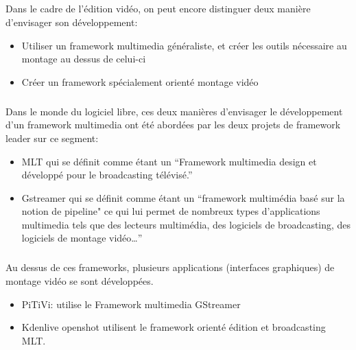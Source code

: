 \subparagraph{}

Dans le cadre de l'édition vidéo, on peut encore distinguer deux
manière d'envisager son développement:

\begin {itemize}

  \item {Utiliser un framework multimedia généraliste, et créer les
  outils nécessaire
         au montage au dessus de celui-ci} %

  \item {Créer un framework spécialement orienté montage vidéo}

\end {itemize}

\subparagraph{}

Dans le monde du logiciel libre, ces deux manières d'envisager le
développement d'un framework multimedia ont été abordées par les
deux projets de framework leader sur ce segment:

\begin {itemize}

  \item {MLT qui se définit comme étant un ``Framework multimedia design
    et développé pour le broadcasting télévisé.''}

  \item {Gstreamer qui se définit comme étant un ``framework multimédia
    basé sur la notion de pipeline" ce qui lui permet de nombreux types
    d'applications multimedia tels que des lecteurs multimédia, des
    logiciels de broadcasting, des logiciels de montage vidéo\ldots''}

\end {itemize}

\subparagraph {}

Au dessus de ces frameworks, plusieurs applications (interfaces graphiques)
de montage vidéo se sont développées.

\begin {itemize}

  \item {PiTiVi: utilise le Framework multimedia GStreamer}

  \item {Kdenlive openshot utilisent le framework
  orienté édition et broadcasting MLT.}

\end {itemize}

